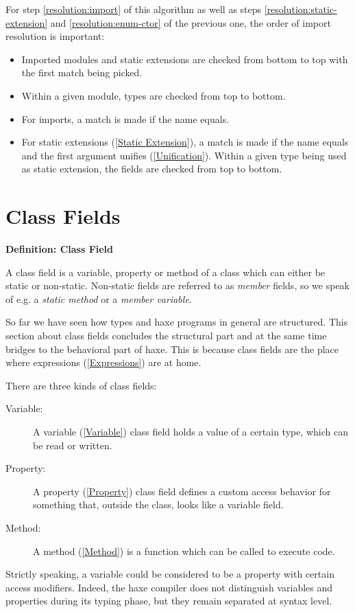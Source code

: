 \documentclass{article}
\newenvironment{myshaded}
  {\def\FrameCommand{\fboxsep=\topsep\colorbox{bgcolor}}%
  \MakeFramed {\advance\hsize-\width \FrameRestore}}%
 {\endMakeFramed}
\newcommand{\define}[3][Definition]
	{\begin{myshaded}\noindent\textbf{#1: #2}\par\nobreak\noindent\ignorespaces#3\label{def:#2}\end{myshaded}}
\newcommand{\tref}[2]{#1 (\ref{#2})}
\begin{document}
For step \ref{resolution:import} of this algorithm as well as steps \ref{resolution:static-extension} and \ref{resolution:enum-ctor} of the previous one, the order of import resolution is important:

\begin{itemize}
	\item Imported modules and static extensions are checked from bottom to top with the first match being picked.
	\item Within a given module, types are checked from top to bottom.
	\item For imports, a match is made if the name equals.
	\item For \tref{static extensions}{Static Extension}, a match is made if the name equals and the first argument \tref{unifies}{Unification}. Within a given type being used as static extension, the fields are checked from top to bottom.
\end{itemize}




\section{Class Fields}
\label{Class Fields}

\define{Class Field}{A class field is a variable, property or method of a class which can either be static or non-static. Non-static fields are referred to as \emph{member} fields, so we speak of e.g. a \emph{static method} or a \emph{member variable}.}

So far we have seen how types and haxe programs in general are structured. This section about class fields concludes the structural part and at the same time bridges to the behavioral part of haxe. This is because class fields are the place where \tref{expressions}{Expressions} are at home.

There are three kinds of class fields:

\begin{description}
	\item[Variable:] A \tref{variable}{Variable} class field holds a value of a certain type, which can be read or written.
	\item[Property:] A \tref{property}{Property} class field defines a custom access behavior for something that, outside the class, looks like a variable field.
	\item[Method:] A \tref{method}{Method} is a function which can be called to execute code.
\end{description}
Strictly speaking, a variable could be considered to be a property with certain access modifiers. Indeed, the haxe compiler does not distinguish variables and properties during its typing phase, but they remain separated at syntax level.
\end{document}
